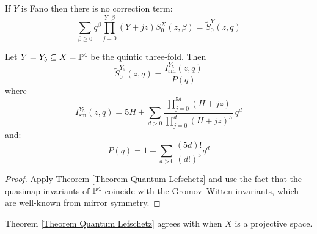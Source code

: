 \begin{cor}
 If $Y$ is Fano then there is no correction term:
\begin{equation*} \sum_{\beta\geq 0} q^\beta\prod_{j=0}^{Y\cdot\beta}(Y+jz)S_0^X(z,\beta) = \tilde{S}_0^Y(z,q) \end{equation*}
\end{cor}

\begin{cor}
Let $Y = Y_5 \subseteq  X = \mathbb P^4$ be the quintic three-fold. Then
\begin{equation*} \tilde{S}_0^{Y_5}(z,q)=\dfrac{I_{\text{sm}}^{Y_5}(z,q)}{P(q)} \end{equation*}
where
\begin{equation*} I_{\text{sm}}^{Y_5}(z,q)=5H+\sum_{d>0}\frac{\prod_{j=0}^{5d}(H+jz)}{\prod_{j=0}^{d}(H+jz)^5} \ q^d \end{equation*}
and:
\begin{equation*} P(q)=1+\sum_{d>0}\frac{(5d)!}{(d!)^5}q^d \end{equation*}
\end{cor}
\begin{proof} Apply Theorem \ref{Theorem Quantum Lefschetz} and use the fact that the quasimap invariants of $\mathbb P^4$ coincide with the Gromov--Witten invariants, which are well-known from mirror symmetry. \end{proof}

\begin{remark}
Theorem \ref{Theorem Quantum Lefschetz} agrees with \cite[Theorem~1]{CZ-mirror} when $X$ is a projective space.
\end{remark}

